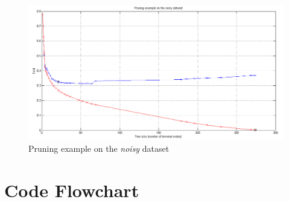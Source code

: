 \documentclass[a4paper]{article}
\begin{document}
\begin{figure}[H]
\center
\includegraphics[width=1\columnwidth]{pruneNoisy} %
\caption{Pruning example on the \emph{noisy} dataset}
\label{pruneNoisy}
\end{figure}

\clearpage


\section{Code Flowchart}

\clearpage

\end{document}
